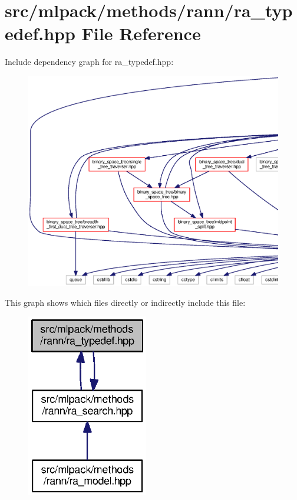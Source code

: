 \section{src/mlpack/methods/rann/ra\+\_\+typedef.hpp File Reference}
\label{ra__typedef_8hpp}
Include dependency graph for ra\+\_\+typedef.\+hpp\+:
\nopagebreak
\begin{figure}[H]
\begin{center}
\leavevmode
\includegraphics[width=350pt]{ra__typedef_8hpp__incl}
\end{center}
\end{figure}
This graph shows which files directly or indirectly include this file\+:
\nopagebreak
\begin{figure}[H]
\begin{center}
\leavevmode
\includegraphics[width=150pt]{ra__typedef_8hpp__dep__incl}
\end{center}
\end{figure}
